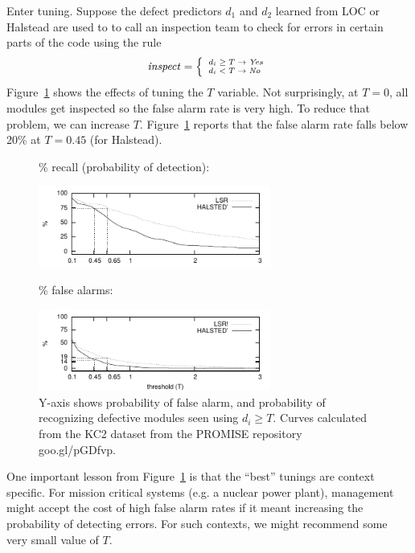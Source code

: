 \documentclass{sig-alternative}
\newcommand{\fig}[1]{Figure~\ref{fig:#1}}
\begin{document}
\noindent
Enter tuning. Suppose the defect predictors $d_1$ and $d_2$  learned from LOC or Halstead
are used to to call an inspection
team to check for errors in certain parts of the code using the rule
\begin{equation}\label{eq:yesno}\scriptsize
\mathit{inspect}= \left\{
\begin{array}{ll}
d_i \ge T \rightarrow \mathit{Yes}\\
d_i <   T \rightarrow \mathit{No} 
\end{array}\right.
\end{equation}
\fig{pd1} shows the effects of tuning the $T$ variable. Not surprisingly,
at $T=0$, all modules get inspected so the false alarm rate is very high. To reduce that
problem, we can increase $T$. \fig{pd1} reports that the false alarm rate falls below
20\% at $T=0.45$ (for Halstead). 

 

\begin{figure}[!t] 
{\scriptsize
\begin{center}

\% recall (probability of detection):   

\includegraphics[width=3in]{lsrvscostpd.pdf}

\% false alarms:

\includegraphics[width=3in]{lsrvscostpf.pdf}
\end{center}}
\caption{
 Y-axis shows probability of false alarm,
  and
  probability of recognizing defective modules  seen using \mbox{$d_i \ge T$}.
  Curves calculated from the KC2 dataset from the PROMISE repository goo.gl/pGDfvp.
 }\label{fig:pd1}
 \end{figure}


One  important lesson from  \fig{pd1} is that the ``best'' tunings are context
specific. For mission critical systems (e.g. a nuclear power plant), management
might accept the cost of high false alarm rates if it meant increasing the probability
of detecting errors. For such contexts, we might recommend some very small value of $T$.
\end{document}
